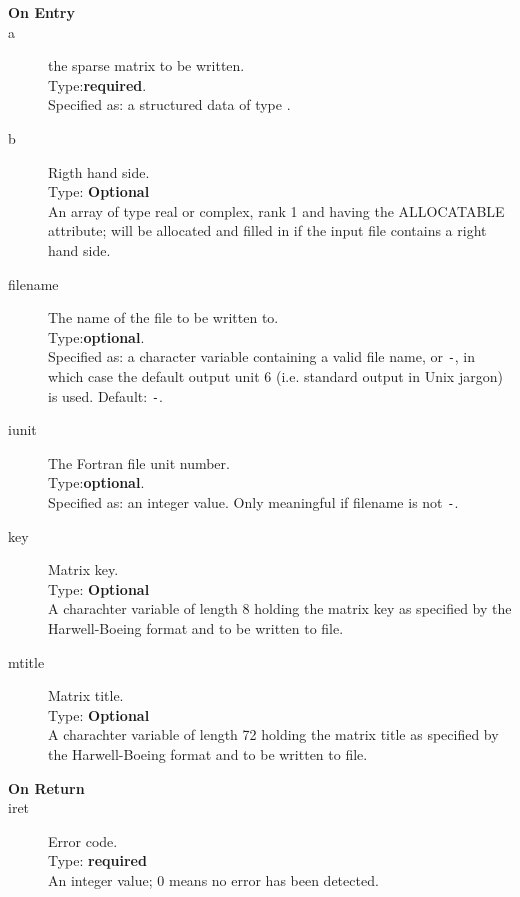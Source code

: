 \begin{description}
\item[\bf  On Entry ]
\item[a] the sparse matrix to be written.\\
Type:{\bf required}.\\
Specified as: a structured data of type \spdata.
\item[b] Rigth hand side.\\
Type: {\bf Optional} \\
An  array of type real or complex, rank 1 and having the ALLOCATABLE
attribute; will be allocated and filled in if the input file contains
a right hand side. 
\item[filename] The name of the file to be written to.\\
Type:{\bf optional}.\\
Specified as: a character variable containing a valid file name, or
\verb|-|, in which case the default output unit  6 (i.e. standard output
in Unix jargon) is used. Default: \verb|-|. 
\item[iunit] The Fortran file unit number.\\
Type:{\bf optional}.\\
Specified as: an integer value. Only meaningful if filename is not \verb|-|.
\item[key] Matrix key.\\
Type: {\bf Optional} \\
A charachter variable of length 8 holding the
matrix key as specified by the Harwell-Boeing format and to be
written to file.
\item[mtitle] Matrix title.\\
Type: {\bf Optional} \\
A charachter variable of length 72 holding the
matrix title as specified by the Harwell-Boeing format and to be
written to file.
\end{description}

\begin{description}
\item[\bf On Return]
\item[iret] Error code.\\
Type: {\bf required} \\
An integer value; 0 means no error has been detected. 
\end{description}





